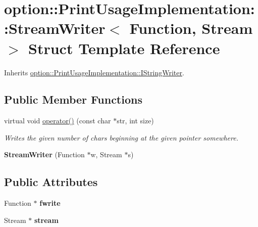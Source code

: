\hypertarget{structoption_1_1_print_usage_implementation_1_1_stream_writer}{\section{option\-:\-:\-Print\-Usage\-Implementation\-:\-:\-Stream\-Writer$<$ \-Function, \-Stream $>$ \-Struct \-Template \-Reference}
\label{structoption_1_1_print_usage_implementation_1_1_stream_writer}
}


\-Inherits \hyperlink{structoption_1_1_print_usage_implementation_1_1_i_string_writer}{option\-::\-Print\-Usage\-Implementation\-::\-I\-String\-Writer}.

\subsection*{\-Public \-Member \-Functions}
\begin{DoxyCompactItemize}
\item 
\hypertarget{structoption_1_1_print_usage_implementation_1_1_stream_writer_ae39bc6378c22d24a490104b7764c37b7}{virtual void \hyperlink{structoption_1_1_print_usage_implementation_1_1_stream_writer_ae39bc6378c22d24a490104b7764c37b7}{operator()} (const char $\ast$str, int size)}\label{structoption_1_1_print_usage_implementation_1_1_stream_writer_ae39bc6378c22d24a490104b7764c37b7}

\begin{DoxyCompactList}\small\item\em \-Writes the given number of chars beginning at the given pointer somewhere. \end{DoxyCompactList}\item 
\hypertarget{structoption_1_1_print_usage_implementation_1_1_stream_writer_aa6ab48848dcbeb9e2cbde5d05ec35005}{{\bfseries \-Stream\-Writer} (\-Function $\ast$w, \-Stream $\ast$s)}\label{structoption_1_1_print_usage_implementation_1_1_stream_writer_aa6ab48848dcbeb9e2cbde5d05ec35005}

\end{DoxyCompactItemize}
\subsection*{\-Public \-Attributes}
\begin{DoxyCompactItemize}
\item 
\hypertarget{structoption_1_1_print_usage_implementation_1_1_stream_writer_a6f54abc9a3f7f00206d87a3619713954}{\-Function $\ast$ {\bfseries fwrite}}\label{structoption_1_1_print_usage_implementation_1_1_stream_writer_a6f54abc9a3f7f00206d87a3619713954}

\item 
\hypertarget{structoption_1_1_print_usage_implementation_1_1_stream_writer_ab4bfd31b1c37376505ccd4230f7f7ad9}{\-Stream $\ast$ {\bfseries stream}}\label{structoption_1_1_print_usage_implementation_1_1_stream_writer_ab4bfd31b1c37376505ccd4230f7f7ad9}

\end{DoxyCompactItemize}
